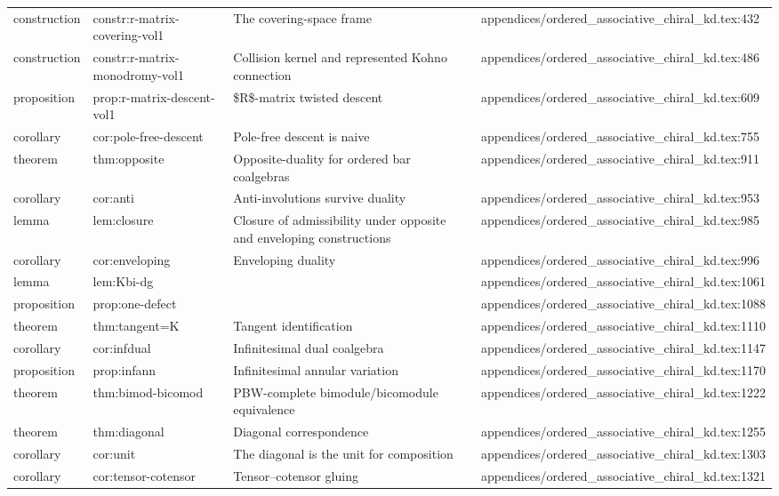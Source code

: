 \documentclass[11pt]{article}
\begin{document}
\begin{longtable}{L{0.10\textwidth}L{0.26\textwidth}L{0.42\textwidth}L{0.22\textwidth}}
construction & constr:r-matrix-covering-vol1 & The covering-space frame & appendices/ordered\_associative\_chiral\_kd.tex:432\\
construction & constr:r-matrix-monodromy-vol1 & Collision kernel and represented Kohno connection & appendices/ordered\_associative\_chiral\_kd.tex:486\\
proposition & prop:r-matrix-descent-vol1 & \$R\$-matrix twisted descent & appendices/ordered\_associative\_chiral\_kd.tex:609\\
corollary & cor:pole-free-descent & Pole-free descent is naive & appendices/ordered\_associative\_chiral\_kd.tex:755\\
theorem & thm:opposite & Opposite-duality for ordered bar coalgebras & appendices/ordered\_associative\_chiral\_kd.tex:911\\
corollary & cor:anti & Anti-involutions survive duality & appendices/ordered\_associative\_chiral\_kd.tex:953\\
lemma & lem:closure & Closure of admissibility under opposite and enveloping constructions & appendices/ordered\_associative\_chiral\_kd.tex:985\\
corollary & cor:enveloping & Enveloping duality & appendices/ordered\_associative\_chiral\_kd.tex:996\\
lemma & lem:Kbi-dg &  & appendices/ordered\_associative\_chiral\_kd.tex:1061\\
proposition & prop:one-defect &  & appendices/ordered\_associative\_chiral\_kd.tex:1088\\
theorem & thm:tangent=K & Tangent identification & appendices/ordered\_associative\_chiral\_kd.tex:1110\\
corollary & cor:infdual & Infinitesimal dual coalgebra & appendices/ordered\_associative\_chiral\_kd.tex:1147\\
proposition & prop:infann & Infinitesimal annular variation & appendices/ordered\_associative\_chiral\_kd.tex:1170\\
theorem & thm:bimod-bicomod & PBW-complete bimodule/bicomodule equivalence & appendices/ordered\_associative\_chiral\_kd.tex:1222\\
theorem & thm:diagonal & Diagonal correspondence & appendices/ordered\_associative\_chiral\_kd.tex:1255\\
corollary & cor:unit & The diagonal is the unit for composition & appendices/ordered\_associative\_chiral\_kd.tex:1303\\
corollary & cor:tensor-cotensor & Tensor--cotensor gluing & appendices/ordered\_associative\_chiral\_kd.tex:1321\\

\end{longtable}
\end{document}
